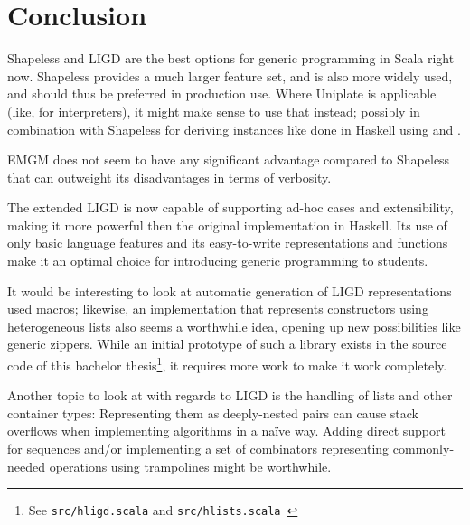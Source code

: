 \chapter{Conclusion}
Shapeless and LIGD are the best options for generic programming in Scala
right now. Shapeless provides a much larger feature set, and is also more
widely used, and should thus be preferred in production use. Where Uniplate
is applicable (like, for interpreters), it might make sense to use that
instead; possibly in combination with Shapeless for deriving instances like
done in Haskell using  and .

EMGM does not seem to have any significant advantage compared to Shapeless that
can outweight its disadvantages in terms of verbosity.

The extended LIGD is now capable of supporting ad-hoc cases and extensibility,
making it more powerful then the original implementation in Haskell. Its use
of only basic language features and its easy-to-write representations and
functions make it an optimal choice for introducing generic programming to
students.

It would be interesting to look at automatic generation of LIGD representations
used macros; likewise, an implementation that represents constructors using
heterogeneous lists also seems a worthwhile idea, opening up new possibilities
like generic zippers. While an initial prototype of such a library exists in
the source code of this bachelor thesis\footnote{See \texttt{src/hligd.scala} and
\texttt{src/hlists.scala}~\cite{src}}, it requires more work to make it work completely.

Another topic to look at with regards to LIGD is the handling of lists and
other container types: Representing them as deeply-nested pairs can cause
stack overflows when implementing algorithms in a naïve way. Adding direct
support for sequences and/or implementing a set of combinators representing
commonly-needed operations using trampolines might be worthwhile.
